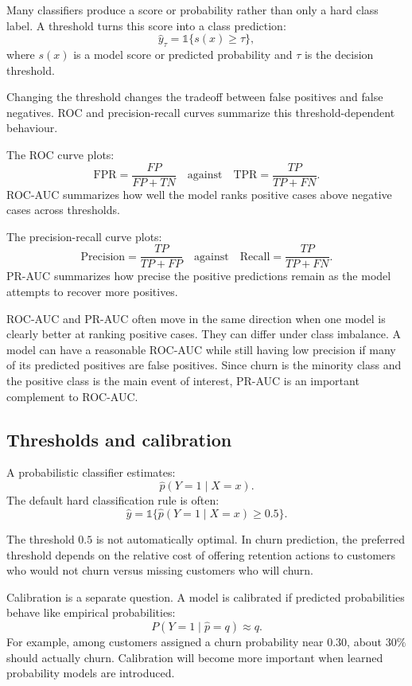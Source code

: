 Many classifiers produce a score or probability rather than only a hard class label. A threshold turns this score into a class prediction:
\[
\hat{y}_{\tau}
=
\mathbb{1}
\{
s(x)\geq \tau
\},
\]
where \(s(x)\) is a model score or predicted probability and \(\tau\) is the decision threshold.

Changing the threshold changes the tradeoff between false positives and false negatives. ROC and precision-recall curves summarize this threshold-dependent behaviour.

The ROC curve plots:
\[
\text{FPR}
=
\frac{FP}{FP+TN}
\quad
\text{against}
\quad
\text{TPR}
=
\frac{TP}{TP+FN}.
\]
ROC-AUC summarizes how well the model ranks positive cases above negative cases across thresholds.

The precision-recall curve plots:
\[
\text{Precision}
=
\frac{TP}{TP+FP}
\quad
\text{against}
\quad
\text{Recall}
=
\frac{TP}{TP+FN}.
\]
PR-AUC summarizes how precise the positive predictions remain as the model attempts to recover more positives.

ROC-AUC and PR-AUC often move in the same direction when one model is clearly better at ranking positive cases. They can differ under class imbalance. A model can have a reasonable ROC-AUC while still having low precision if many of its predicted positives are false positives. Since churn is the minority class and the positive class is the main event of interest, PR-AUC is an important complement to ROC-AUC.

\subsection{Thresholds and calibration}

A probabilistic classifier estimates:
\[
\hat{p}(Y=1\mid X=x).
\]
The default hard classification rule is often:
\[
\hat{y}
=
\mathbb{1}
\{
\hat{p}(Y=1\mid X=x)\geq 0.5
\}.
\]

The threshold \(0.5\) is not automatically optimal. In churn prediction, the preferred threshold depends on the relative cost of offering retention actions to customers who would not churn versus missing customers who will churn.

Calibration is a separate question. A model is calibrated if predicted probabilities behave like empirical probabilities:
\[
P(Y=1 \mid \hat{p}=q) \approx q.
\]
For example, among customers assigned a churn probability near \(0.30\), about \(30\%\) should actually churn. Calibration will become more important when learned probability models are introduced.

